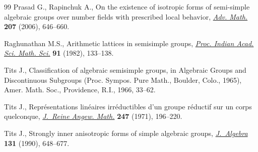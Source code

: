 \documentclass[pdftex]{sigma}
\numberwithin{equation}{section}
\begin{document}
\begin{thebibliography}{99}
Prasad G., Rapinchuk A., On the existence of isotropic forms of semi-simple
  algebraic groups over number f\/ields with prescribed local behavior,
  \href{http://dx.doi.org/10.1016/j.aim.2006.01.001}{\textit{Adv. Math.}} \textbf{207} (2006), 646--660.

Raghunathan M.S., Arithmetic lattices in semisimple groups, \href{http://dx.doi.org/10.1007/BF02967980}{\textit{Proc.
  Indian Acad. Sci. Math. Sci.}} \textbf{91} (1982), 133--138.

Tits J., Classif\/ication of algebraic semisimple groups, in Algebraic {G}roups
  and {D}iscontinuous {S}ubgroups ({P}roc. {S}ympos. {P}ure {M}ath., {B}oulder,
  {C}olo., 1965), Amer. Math. Soc., Providence, R.I., 1966, 33--62.

Tits J., Repr\'esentations lin\'eaires irr\'eductibles d'un groupe r\'eductif
  sur un corps quelconque, \href{http://dx.doi.org/10.1515/crll.1971.247.196}{\textit{J.~Reine Angew. Math.}} \textbf{247} (1971),
  196--220.

Tits J., Strongly inner anisotropic forms of simple algebraic groups,
  \href{http://dx.doi.org/10.1016/0021-8693(90)90201-X}{\textit{J.~Algebra}} \textbf{131} (1990), 648--677.

\end{thebibliography}\LastPageEnding
\end{document}

